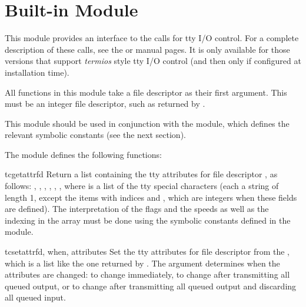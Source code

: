 \section{Built-in Module }
\label{module-termios}


This module provides an interface to the \POSIX{} calls for tty I/O
control.  For a complete description of these calls, see the \POSIX{} or
\UNIX{} manual pages.  It is only available for those \UNIX{} versions
that support \POSIX{} \emph{termios} style tty I/O control (and then
only if configured at installation time).

All functions in this module take a file descriptor  as their
first argument.  This must be an integer file descriptor, such as
returned by .

This module should be used in conjunction with the
 module, which defines the
relevant symbolic constants (see the next section).

The module defines the following functions:

\begin{funcdesc}{tcgetattr}{fd}
Return a list containing the tty attributes for file descriptor
, as follows: \code{[}, , ,
, , , \code{]} where
 is a list of the tty special characters (each a string of
length 1, except the items with indices  and
, which are integers when these fields are
defined).  The interpretation of the flags and the speeds as well as
the indexing in the  array must be done using the symbolic
constants defined in the  module.
\end{funcdesc}

\begin{funcdesc}{tcsetattr}{fd, when, attributes}
Set the tty attributes for file descriptor  from the
, which is a list like the one returned by
.  The  argument determines when the
attributes are changed:  to change
immediately,  to change after transmitting
all queued output, or  to change after
transmitting all queued output and discarding all queued input.
\end{funcdesc}

